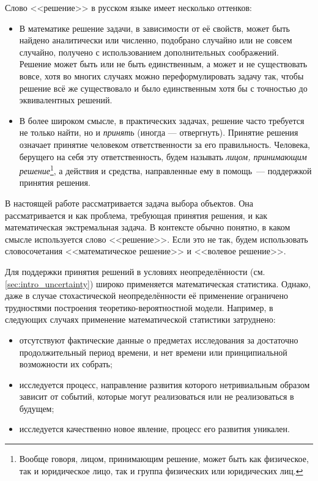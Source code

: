Слово <<решение>> в русском языке имеет несколько оттенков: 
\begin{itemize}
  \item В математике решение задачи, в зависимости от её свойств, может быть найдено аналитически или численно, подобрано случайно или не совсем случайно, получено с использованием дополнительных соображений. Решение может быть или не быть единственным, а может и не существовать вовсе,  хотя во многих случаях можно переформулировать задачу так, чтобы решение всё же существовало и было единственным хотя бы с точностью до эквивалентных решений. 
  \item В более широком смысле, в практических задачах, решение часто требуется не только найти, но и {\sl принять} (иногда --- отвергнуть). Принятие решения означает принятие человеком ответственности за его правильность. Человека, берущего на себя эту ответственность, будем называть {\sl лицом, принимающим решение}\footnote{Вообще говоря, лицом, принимающим решение, может быть как физическое, так и юридическое лицо, так и группа физических или юридических лиц.}, а действия и средства, направленные ему в помощь~--- поддержкой принятия решения. 
\end{itemize}

В настоящей работе рассматривается задача выбора объектов. Она рассматривается и как проблема, требующая принятия решения, и как математическая экстремальная задача. В контексте обычно понятно, в каком смысле используется слово <<решение>>. Если это не так, будем использовать словосочетания <<математическое решение>> и <<волевое решение>>.
 

Для поддержки принятия решений в условиях неопределённости (см. \ref{sec:intro_uncertainty}) широко применяется математическая статистика. Однако, даже в случае стохастической неопределённости её применение ограничено трудностями построения теоретико-вероятностной модели.  Например, в следующих случаях применение математической статистики затруднено:
\begin{itemize}
 \item отсутствуют фактические данные о предметах исследования за достаточно продолжительный период времени, и нет времени или принципиальной возможности их собрать; 
 \item исследуется процесс, направление развития которого нетривиальным образом зависит от событий, которые могут реализоваться или не реализоваться в будущем;
 \item исследуется качественно новое явление, процесс его развития уникален.
\end{itemize}

